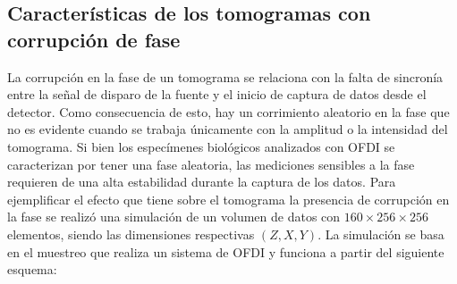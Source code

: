 


\subsection{Características de los tomogramas con corrupción de fase}
\label{sec:caracteristicas_tomogramas_corruptos}

La corrupción en la fase de un tomograma se relaciona con la falta de sincronía entre la señal de disparo de la fuente y el inicio de captura de datos desde el detector. Como consecuencia de esto, hay un corrimiento aleatorio en la fase que no es evidente cuando se trabaja únicamente con la amplitud o la intensidad del tomograma. Si bien los especímenes biológicos analizados con OFDI se caracterizan por tener una fase aleatoria, las mediciones sensibles a la fase requieren de una alta estabilidad durante la captura de los datos. Para ejemplificar el efecto que tiene sobre el tomograma la presencia de corrupción en la fase se realizó una simulación de un volumen de datos con $160\times256\times256$ elementos, siendo las dimensiones respectivas $(Z,X,Y)$. La simulación se basa en el muestreo que realiza un sistema de OFDI y funciona a partir del siguiente esquema:

